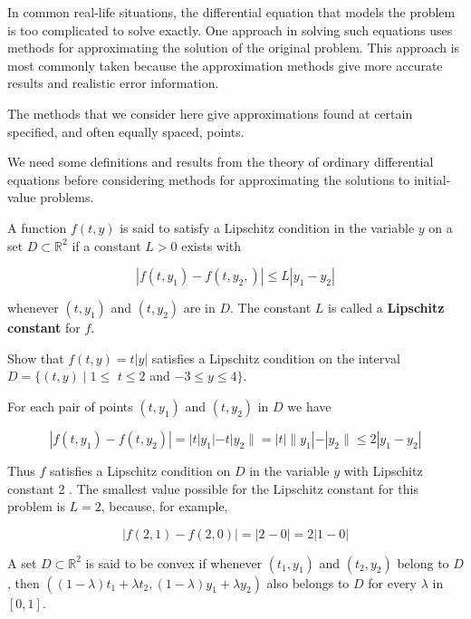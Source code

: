 In common real-life situations, the differential equation that models the problem is too complicated to solve exactly. One approach in solving such equations uses methods for approximating the solution of the original problem. This approach is most commonly taken because the approximation methods give more accurate results and realistic error information.

The methods that we consider here give approximations found at certain specified, and often equally spaced, points.

We need some definitions and results from the theory of ordinary differential equations before considering methods for approximating the solutions to initial-value problems.

\begin{definition}
A function $f(t, y)$ is said to satisfy a Lipschitz condition in the variable $y$ on a set $D \subset \mathbb{R}^{2}$ if a constant $L>0$ exists with

$$
\left|f\left(t, y_{1}\right)-f\left(t, y_{2},\right)\right| \leq L\left|y_{1}-y_{2}\right|
$$

whenever $\left(t, y_{1}\right)$ and $\left(t, y_{2}\right)$ are in $D$. The constant $L$ is called a {\bf Lipschitz constant} for $f$.
\end{definition}

\begin{example}
Show that $f(t, y)=t|y|$ satisfies a Lipschitz condition on the interval $D=\{(t, y) \mid 1 \leq$ $t \leq 2$ and $-3 \leq y \leq 4\}$.
\end{example}

\begin{mysolution}
For each pair of points $\left(t, y_{1}\right)$ and $\left(t, y_{2}\right)$ in $D$ we have

$$
\left|f\left(t, y_{1}\right)-f\left(t, y_{2}\right)\right|=|t| y_{1}|-t| y_{2}\|=|t|\| y_{1}\left|-\left|y_{2} \| \leq 2\right| y_{1}-y_{2}\right|
$$

Thus $f$ satisfies a Lipschitz condition on $D$ in the variable $y$ with Lipschitz constant 2 . The smallest value possible for the Lipschitz constant for this problem is $L=2$, because, for example,

$$
|f(2,1)-f(2,0)|=|2-0|=2|1-0|
$$
\end{mysolution}

\begin{definition}\label{def:convex}
A set $D \subset \mathbb{R}^{2}$ is said to be convex if whenever $\left(t_{1}, y_{1}\right)$ and $\left(t_{2}, y_{2}\right)$ belong to $D$, then $\left((1-\lambda) t_{1}+\lambda t_{2},(1-\lambda) y_{1}+\lambda y_{2}\right)$ also belongs to $D$ for every $\lambda$ in $[0,1]$.
\end{definition}

